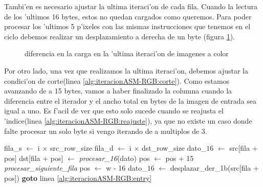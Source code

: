 Tambi'en es necesario ajustar la ultima iteraci'on de cada fila. Cuando la lectura de los 'ultimos 16 bytes, estos no quedan cargados como queremos. Para poder procesar los 'ultimos 5 p'ixeles con las mismas instrucciones que tenemos en el ciclo debemos realizar un desplazamiento a derecha de un byte (figura \ref{est:ciclo}).

\begin{figure}[h!]
\caption{diferencia en la carga en la 'ultima iteraci'on de imagenes a color}
\label{est:ciclo}
\end{figure}


Por otro lado, una vez que realizamos la ultima iteraci'on, debemos ajustar la condici'on de corte(linea \ref{alg:iteracionASM-RGB:corte}). Como estamos avanzando de a 15 bytes, vamos a haber finalizado la columna cuando la diferencia entre el iterador y el ancho total en bytes de la imagen de entrada sea igual a uno. Es f'acil de ver que esto solo sucede cuando se reajusta el 'indice(linea \ref{alg:iteracionASM-RGB:reajuste}), ya que no existe un caso donde falte procesar un solo byte si vengo iterando de a multiplos de 3.

\begin{algorithm}[h!]
\caption{}\label{alg:iteracionASM-RGB}
\begin{algorithmic}[1]
	\STATE fila_s $\leftarrow$ i $\times$ src\_row\_size	
	\STATE fila_d $\leftarrow$ i $\times$ dst\_row\_size
		\STATE dato_{$16$} $\leftarrow$ src[fila + pos]
		\STATE dst[fila + pos] $\leftarrow$ \textit{procesar_{16}}(dato)
		\label{alg:iteracionASM-RGB:entry}
		\STATE pos $\leftarrow$ pos + 15		
		 		\label{alg:iteracionASM-RGB:corte}
			\STATE \textit{procesar\_siguiente\_fila}
			\STATE pos $\leftarrow$ w - 16 \label{alg:iteracionASM-RGB:reajuste}
			\STATE dato_{$16$} $\leftarrow$ desplazar\_der_{1b}(src[fila + pos]) 
			\STATE \textbf{goto} linea \ref{alg:iteracionASM-RGB:entry}
		\ENDIF		
	\ENDFOR
\ENDFOR
\end{algorithmic}
\end{algorithm}

